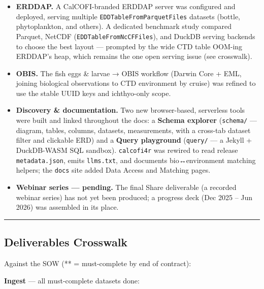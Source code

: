 \documentclass[
  letterpaper,
  DIV=11,
  numbers=noendperiod]{scrreprt}
\begin{document}
\begin{itemize}
\item
  \textbf{ERDDAP.} A CalCOFI-branded ERDDAP server was configured and
  deployed, serving multiple \texttt{EDDTableFromParquetFiles} datasets
  (bottle, phytoplankton, and others). A dedicated benchmark study
  compared Parquet, NetCDF (\texttt{EDDTableFromNcCFFiles}), and DuckDB
  serving backends to choose the best layout --- prompted by the wide
  CTD table OOM-ing ERDDAP's heap, which remains the one open serving
  issue (see crosswalk).
\item
  \textbf{OBIS.} The fish eggs \& larvae → OBIS workflow (Darwin Core +
  EML, joining biological observations to CTD environment by cruise) was
  refined to use the stable UUID keys and ichthyo-only scope.
\item
  \textbf{Discovery \& documentation.} Two new browser-based, serverless
  tools were built and linked throughout the docs: a \textbf{Schema
  explorer} (\texttt{schema/} --- diagram, tables, columns, datasets,
  measurements, with a cross-tab dataset filter and clickable ERD) and a
  \textbf{Query playground} (\texttt{query/} --- a Jekyll + DuckDB-WASM
  SQL sandbox). \texttt{calcofi4r} was rewired to read release
  \texttt{metadata.json}, emits \texttt{llms.txt}, and documents
  bio↔environment matching helpers; the \texttt{docs} site added Data
  Access and Matching pages.
\item
  \textbf{Webinar series --- pending.} The final Share deliverable (a
  recorded webinar series) has not yet been produced; a progress deck
  (Dec 2025 -- Jun 2026) was assembled in its place.
\end{itemize}

\begin{center}\rule{0.5\linewidth}{0.5pt}\end{center}

\subsection{Deliverables Crosswalk}\label{deliverables-crosswalk}

Against the SOW (** = must-complete by end of contract):

\textbf{Ingest} --- all must-complete datasets done:
\end{document}
